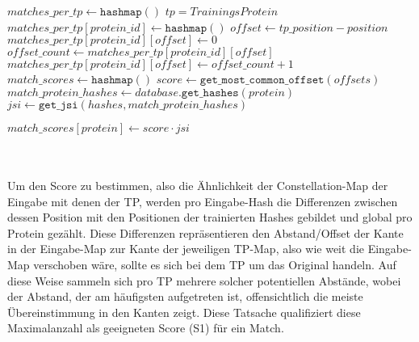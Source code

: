 \begin{enumerate}[a)]
\begin{minipage}{\Width}
\begin{algorithm}[H]
\begin{algorithmic}[1]
                            \State $matches\_per\_tp \gets \texttt{hashmap}()$ \Comment $tp=Trainings Protein$
                                            \State $matches\_per\_tp[protein\_id] \gets \texttt{hashmap}()$
                                        \EndIf
                                        \State $offset \gets tp\_position - position$
                                            \State $matches\_per\_tp[protein\_id][offset] \gets 0$
                                        \EndIf
                                        \State $offset\_count \gets matches\_per\_tp[protein\_id][offset]$
                                        \State $matches\_per\_tp[protein\_id][offset] \gets offset\_count + 1$
                                    \EndFor
                                \EndIf
                            \EndFor
                            \State $match\_scores \gets \texttt{hashmap}()$
                                \State $score \gets \texttt{get\_most\_common\_offset}(offsets)$
                                \State $match\_protein\_hashes \gets database.\texttt{get\_hashes}(protein)$
                                \State $jsi \gets \texttt{get\_jsi}(hashes, match\_protein\_hashes)$

                                \State $match\_scores[protein] \gets score \cdot jsi$
                            \EndFor
                        \end{algorithmic}
                    \end{algorithm}
                \end{minipage}\hfill\\\hfill\\

                Um den Score zu bestimmen, also die Ähnlichkeit der Constellation-Map der Eingabe mit denen der \ac{TP}, werden pro Eingabe-Hash die Differenzen zwischen dessen Position mit den Positionen der trainierten Hashes gebildet und global pro Protein gezählt. Diese Differenzen repräsentieren den Abstand/Offset der Kante in der Eingabe-Map zur Kante der jeweiligen \ac{TP}-Map, also wie weit die Eingabe-Map verschoben wäre, sollte es sich bei dem \ac{TP} um das Original handeln. Auf diese Weise sammeln sich pro \ac{TP} mehrere solcher potentiellen Abstände, wobei der Abstand, der am häufigsten aufgetreten ist, offensichtlich die meiste Übereinstimmung in den Kanten zeigt. Diese Tatsache qualifiziert diese Maximalanzahl als geeigneten Score (S1) für ein Match.


\end{enumerate}
